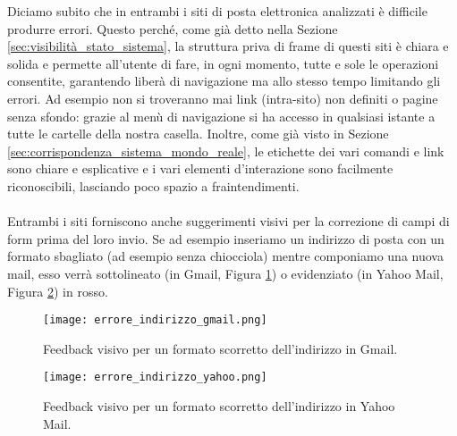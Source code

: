 		Diciamo subito che in entrambi i siti di posta elettronica analizzati è difficile produrre errori. Questo perché, come già detto nella Sezione \ref{sec:visibilità_stato_sistema}, la struttura priva di frame di questi siti è chiara e solida e permette all'utente di fare, in ogni momento, tutte e sole le operazioni consentite, garantendo liberà di navigazione ma allo stesso tempo limitando gli errori. Ad esempio non si troveranno mai link (intra-sito) non definiti o pagine senza sfondo: grazie al menù di navigazione si ha accesso in qualsiasi istante a tutte le cartelle della nostra casella. Inoltre, come già visto in Sezione \ref{sec:corrispondenza_sistema_mondo_reale}, le etichette dei vari comandi e link sono chiare e esplicative e i vari elementi d'interazione sono facilmente riconoscibili, lasciando poco spazio a fraintendimenti.\\
		\\
		Entrambi i siti forniscono anche suggerimenti visivi per la correzione di campi di form prima del loro invio. Se ad esempio inseriamo un indirizzo di posta con un formato sbagliato (ad esempio senza chiocciola) mentre componiamo una nuova mail, esso verrà sottolineato (in Gmail, Figura \ref{fig:errore_indirizzo_gmail}) o evidenziato (in Yahoo Mail, Figura \ref{fig:errore_indirizzo_yahoo}) in rosso.
		\begin{figure}[h!]
			\begin{center}
				\texttt{[image: errore\_indirizzo\_gmail.png]}
			\end{center}
			\caption[Errore indirizzo in Gmail]{Feedback visivo per un formato scorretto dell'indirizzo in Gmail.}
			\label{fig:errore_indirizzo_gmail}
		\end{figure}
		\begin{figure}[h!]
			\begin{center}
				\texttt{[image: errore\_indirizzo\_yahoo.png]}
			\end{center}
			\caption[Errore indirizzo in Yahoo Mail]{Feedback visivo per un formato scorretto dell'indirizzo in Yahoo Mail.}
			\label{fig:errore_indirizzo_yahoo}
		\end{figure}
		\\
		
